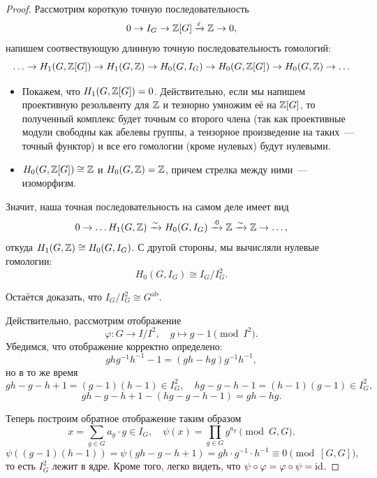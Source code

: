  	\begin{proof}
 		Рассмотрим короткую точную последовательность 
 		\[
 			0 \to I_G \to \mathbb{Z}[G] \xrightarrow{\varepsilon} \mathbb{Z} \to 0,
 		\]
 		напишем соотвествующую длинную точную последовательность гомологий: 
 		\[
 			\ldots \to H_1(G, \mathbb{Z}[G]) \to H_1(G, \mathbb{Z}) \to H_0(G, I_G) \to H_0(G, \mathbb{Z}[G]) \to H_0(G, \mathbb{Z}) \to \ldots
 		\]

 		\begin{itemize}
 			\item Покажем, что $H_{1}(G, \mathbb{Z}[G]) = 0$. Действительно, если мы напишем проективную резольвенту для $\mathbb{Z}$ и тезнорно умножим её на $\mathbb{Z}[G]$, то полученный комплекс будет точным со второго члена (так как проективные модули свободны как абелевы группы, а тензорное произведение на таких~--- точный функтор) и все его гомологии (кроме нулевых) будут нулевыми. 

 			\item $H_0(G, \mathbb{Z}[G]) \cong \mathbb{Z}$  и $H_0(G, \mathbb{Z}) = \mathbb{Z}$, причем стрелка между ними~--- изоморфизм. 

 		\end{itemize}

 		Значит, наша точная последовательность на самом деле имеет вид 
 		\[
 			0 \to \ldots H_1(G, \mathbb{Z}) \xrightarrow{\sim} H_0(G, I_G) \xrightarrow{\cdot 0} \mathbb{Z} \xrightarrow{\sim} \mathbb{Z} \to \ldots,
 		\]
 		откуда $H_1(G, \mathbb{Z}) \cong H_0(G, I_G)$. С другой стороны, мы вычисляли нулевые гомологии: 
 		\[
 			H_0(G, I_G) \cong I_G/I_G^2.
 		\]

 		Остаётся доказать, что $I_{G}/I_{G}^2 \cong G^{\mathrm{ab}}$. 

 		Действительно, рассмотрим отображение 
 		\[
 			\varphi\colon G \to I/I^2, \quad g \mapsto g - 1 \pmod{I^2}.
 		\]
 		Убедимся, что отображение корректно определено:
 		\[
 			gh g^{-1}h^{-1} - 1 = (gh - hg)g^{-1}h^{-1},
 		\]
 		но в то же время 
 		\[
 			gh - g - h + 1 = (g - 1)(h - 1) \in I_G^2, \quad hg - g - h - 1 = (h - 1)(g - 1) \in I_G^2,
 		\]
 		\[
 			gh - g - h + 1 - (hg - g - h - 1) = gh - hg.
 		\]

 		Теперь построим обратное отображение таким образом
 		\[
 			x = \sum_{g \in G} a_g \cdot g \in I_G, \quad \psi(x) = \prod_{g \in G} g^{a_g} \pmod{G, G}. 
 		\]
 		\[
 			\psi((g - 1)(h - 1)) = \psi(gh - g - h + 1) = gh \cdot g^{-1} \cdot h^{-1} \equiv 0 \pmod{[G, G]},
 		\]
 		то есть $I_G^2$ лежит в ядре. Кроме того, легко видеть, что $\psi \circ \varphi = \varphi \circ \psi = \operatorname{id}$.
 	\end{proof}

